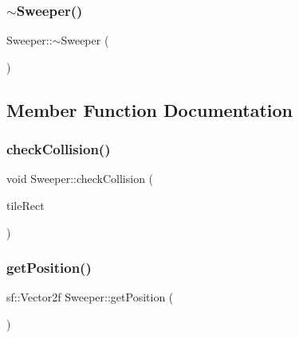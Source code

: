 \mbox{\label{class_sweeper_a3099037dc68c87b680a8b235fb61848c}} 
\subsubsection{\texorpdfstring{$\sim$Sweeper()}{~Sweeper()}}
{\footnotesize\ttfamily Sweeper\+::$\sim$\+Sweeper (\begin{DoxyParamCaption}{ }\end{DoxyParamCaption})}



\subsection{Member Function Documentation}
\mbox{\label{class_sweeper_a627463bc1a0a2bb5d1ba215a4b823d85}} 
\subsubsection{\texorpdfstring{checkCollision()}{checkCollision()}}
{\footnotesize\ttfamily void Sweeper\+::check\+Collision (\begin{DoxyParamCaption}\item[{sf\+::\+Float\+Rect}]{tile\+Rect }\end{DoxyParamCaption})}

\mbox{\label{class_sweeper_a9fecea4436904ee3357a0b763f2c6c76}} 
\subsubsection{\texorpdfstring{getPosition()}{getPosition()}}
{\footnotesize\ttfamily sf\+::\+Vector2f Sweeper\+::get\+Position (\begin{DoxyParamCaption}{ }\end{DoxyParamCaption})}

\mbox{\label{class_sweeper_a1fbc98affe3222dec0bb23f03dfe63e5}} 

